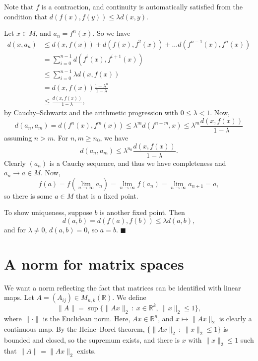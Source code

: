 \documentclass[letter-paper]{tufte-book}
\newenvironment{proof}[1][Proof]{\begin{trivlist}
\item[\hskip \labelsep {\bfseries #1}]}{\end{trivlist}}
\newcommand{\qed}{\hfill$\blacksquare$}
\begin{document}
\begin{proof}
  Note that $f$ is a contraction, and continuity is automatically satisfied from
  the condition that $d(f(x), f(y)) \leq \lambda d(x,y)$.
  
  Let $x\in M$, and $a_n = f^n(x)$. So we have
  \begin{align*}
    d(x, a_n) &\leq d(x, f(x)) + d(f(x), f^2(x)) + \ldots d(f^{n-1}(x), f^n(x)) \\
      &= \sum_{i=0}^{n-1} d(f^i(x), f^{i+1}(x))\\
      &\leq \sum_{i=0}^{n-1} \lambda d(x, f(x))\\
      &= d(x, f(x)) \frac{1-\lambda^n}{1 - \lambda}\\
      &\leq \frac{d(x, f(x))}{1 - \lambda},
  \end{align*}
  by Cauchy--Schwartz and the arithmetic progression with $0\leq\lambda< 1$.
  Now,
  \begin{equation*}
    d(a_n, a_m) = d(f^n(x), f^m(x)) \leq \lambda^m d(f^{n-m}, x) \leq \lambda^m \frac{d(x, f(x))}{1-\lambda}
  \end{equation*}
  assuming $n>m$. For $n,m \geq n_0$, we have
  \begin{equation*}
    d(a_n, a_m) \leq \lambda^{n_0} \frac{d(x, f(x))}{1-\lambda}.
  \end{equation*}
  Clearly $(a_n)$ is a Cauchy sequence, and thus we have completeness and $a_n
  \to a \in M$. Now,
  \begin{equation*}
    f(a) = f\left(\lim_{n\to\infty} a_n\right) = \lim_{n\to\infty} f(a_n) = \lim_{n\to\infty} a_{n+1} = a,
  \end{equation*}
  so there is some $a\in M$ that is a fixed point.
  
  To show uniqueness, suppose $b$ is another fixed point. Then
  \begin{equation*}
    d(a,b) = d(f(a), f(b)) \leq \lambda d(a,b),
  \end{equation*}
  and for $\lambda \neq 0$, $d(a,b)=0$, so $a=b$. \qed
\end{proof}


\section{A norm for matrix spaces}

We want a norm reflecting the fact that matrices can be identified with linear
maps. Let $A = (A_{ij}) \in M_{n,k}(\mathbb{R})$. We define
\begin{equation}
  \| A \| = \sup \{ \|Ax\|_2 \ : \ x \in \mathbb{R}^k,\ \|x\|_2 \leq 1\},
\end{equation}
where $\|\cdot\|$ is the Euclidean norm. Here, $Ax \in \mathbb{R}^n$, and $x
\mapsto \|Ax\|_2$ is clearly a continuous map. By the Heine--Borel theorem, $\{
\|Ax\|_2\ : \ \|x\|_2 \leq 1\}$ is bounded and closed, so the supremum exists, and
there is $x$ with $\|x\|_2 \leq 1$ such that $\| A \| = \|Ax\|_2$ exists.
\end{document}
